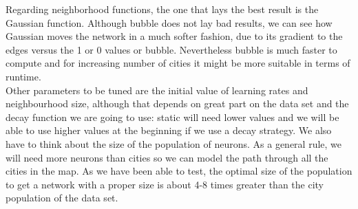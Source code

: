 \documentclass[11pt]{article}
\begin{document}
Regarding neighborhood functions, the one that lays the best result is the Gaussian
function. Although bubble does not lay bad results, we can see how Gaussian
moves the network in a much softer fashion, due to its gradient to the edges
versus the 1 or 0 values or bubble. Nevertheless bubble is much faster to compute and for increasing number of cities it might be more suitable in terms of runtime. \\

Other parameters to be tuned are the initial value of learning rates and
neighbourhood size, although that depends on great part on the data set and the
decay function we are going to use: static will need lower values and we will be
able to use higher values at the beginning if we use a decay strategy. We also
have to think about the size of the population of neurons. As a general rule, we
will need more neurons than cities so we can model the path through all the
cities in the map. As we have been able to test, the optimal size of the
population to get a network with a proper size is about 4-8 times greater than
the city population of the data set.\\
\end{document}
